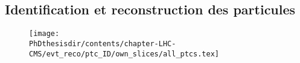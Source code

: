 \subsection{Identification et reconstruction des particules}\label{chapter-LHC-section-evt_reco-subsec-ptc_ID}
\begin{figure}
\texttt{[image: \\PhDthesisdir/contents/chapter-LHC-CMS/evt\_reco/ptc\_ID/own\_slices/all\_ptcs.tex]}
\end{figure}